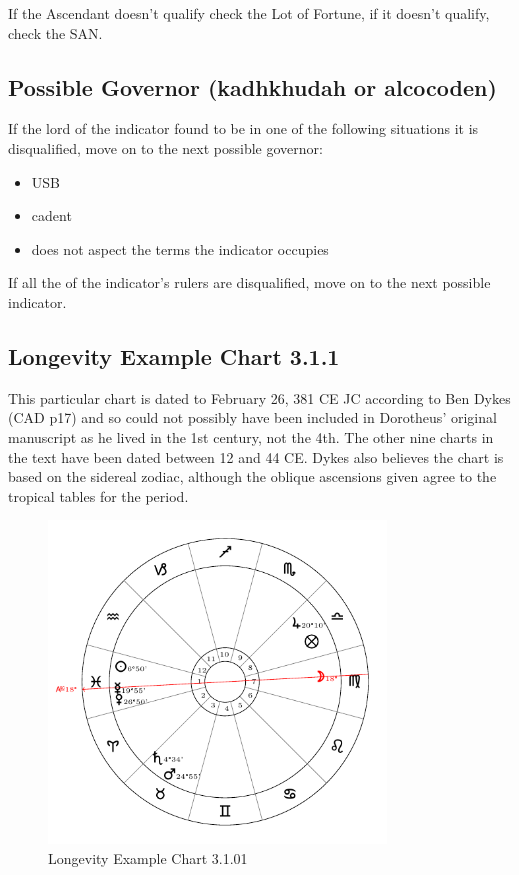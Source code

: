 If  the Ascendant doesn't qualify check the Lot of Fortune, if it doesn't qualify, check the SAN.

\vspace{-0.5em}
\subsection{Possible Governor (kadhkhudah or alcocoden)}
If the lord of the indicator found to be in one of the following situations  it is disqualified, move on to the next possible governor:

\begin{itemize}[topsep=0em, itemsep=0em]
\item {} USB
\item {} cadent
\item {} does not aspect the terms the indicator occupies
\end{itemize}

If all the of the indicator's rulers are disqualified, move on to the next possible indicator.

\newpage
\subsection{Longevity Example Chart 3.1.1}
\vspace{0.5em}
\begin{mdframed}[backgroundcolor=cyan!5, rightmargin=1em, leftmargin=1em]
This particular chart is dated to February 26, 381 CE JC according to Ben Dykes (CAD p17) and so could not possibly have been included in Dorotheus' original manuscript as he lived in the 1st century, not the 4th. The other nine charts in the text have been dated between 12 and 44 CE. Dykes also believes the chart is based on the sidereal zodiac, although the oblique ascensions given agree to the tropical tables for the period.
\end{mdframed}

\vspace{-1em}
\begin{figure}[H]
\centering
\includegraphics[width=0.8\textwidth]{charts/3_1_01}
\vspace{-1em}
\caption{Longevity Example Chart 3.1.01}
\end{figure}

